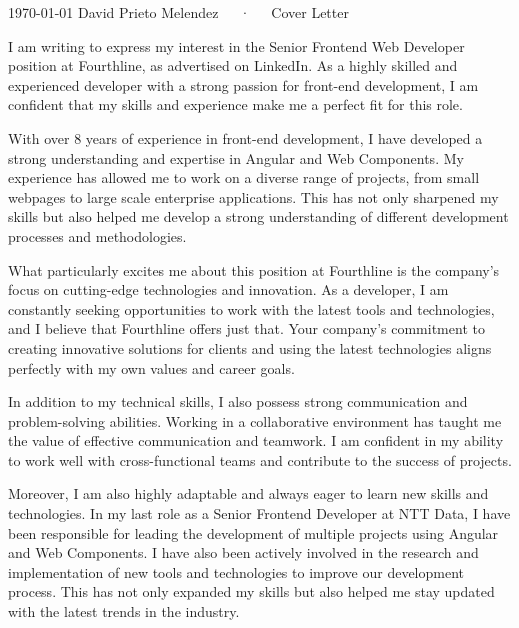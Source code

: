 \documentclass[11pt, a4paper]{awesome-cv}
\begin{document}
\makecvheader[R]

\makecvfooter
  {\today}
  {David Prieto Melendez~~~·~~~Cover Letter}
  {}

\makelettertitle

\begin{cvletter}

I am writing to express my interest in the Senior Frontend Web Developer position at Fourthline, as advertised on LinkedIn. As a highly skilled and experienced developer with a strong passion for front-end development, I am confident that my skills and experience make me a perfect fit for this role.

With over 8 years of experience in front-end development, I have developed a strong understanding and expertise in Angular and Web Components. My experience has allowed me to work on a diverse range of projects, from small webpages to large scale enterprise applications. This has not only sharpened my skills but also helped me develop a strong understanding of different development processes and methodologies.

What particularly excites me about this position at Fourthline is the company’s focus on cutting-edge technologies and innovation. As a developer, I am constantly seeking opportunities to work with the latest tools and technologies, and I believe that Fourthline offers just that. Your company’s commitment to creating innovative solutions for clients and using the latest technologies aligns perfectly with my own values and career goals.

In addition to my technical skills, I also possess strong communication and problem-solving abilities. Working in a collaborative environment has taught me the value of effective communication and teamwork. I am confident in my ability to work well with cross-functional teams and contribute to the success of projects.

Moreover, I am also highly adaptable and always eager to learn new skills and technologies. In my last role as a Senior Frontend Developer at NTT Data, I have been responsible for leading the development of multiple projects using Angular and Web Components. I have also been actively involved in the research and implementation of new tools and technologies to improve our development process. This has not only expanded my skills but also helped me stay updated with the latest trends in the industry.


\end{cvletter}
\end{document}
